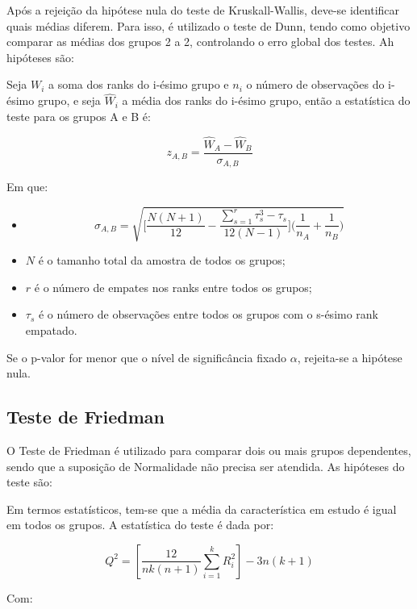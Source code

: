 \documentclass[
]{estat/estat}
\providecommand{\tightlist}{%
  \setlength{\itemsep}{0pt}\setlength{\parskip}{0pt}}\usepackage{longtable,booktabs,array}
\begin{document}
Após a rejeição da hipótese nula do teste de Kruskall-Wallis, deve-se
identificar quais médias diferem. Para isso, é utilizado o teste de
Dunn, tendo como objetivo comparar as médias dos grupos 2 a 2,
controlando o erro global dos testes. Ah hipóteses são:


Seja \(W_i\) a soma dos ranks do i-ésimo grupo e \(n_i\) o número de
observações do i-ésimo grupo, e seja \(\hat{W}_i\) a média dos ranks do
i-ésimo grupo, então a estatística do teste para os grupos A e B é:

\[z_{A,B} = \frac{\hat{W}_A - \hat{W}_B}{\sigma_{A,B}} \]

Em que:

\begin{itemize}
\tightlist
\item
  \[\sigma_{A,B} = \sqrt{\Bigg[\frac{N(N+1)}{12}-\frac{\sum^r_{s=1}\tau_s^3-\tau_s}{12(N-1)}\Bigg]\Bigg(\frac{1}{n_A}+\frac{1}{n_B}\Bigg)}\]
\item
  \(N\) é o tamanho total da amostra de todos os grupos;
\item
  \(r\) é o número de empates nos ranks entre todos os grupos;
\item
  \(\tau_s\) é o número de observações entre todos os grupos com o
  s-ésimo rank empatado.
\end{itemize}

Se o p-valor for menor que o nível de significância fixado \(\alpha\),
rejeita-se a hipótese nula.

\hypertarget{teste-de-friedman}{%
\subsection{Teste de Friedman}\label{teste-de-friedman}}

O Teste de Friedman é utilizado para comparar dois ou mais grupos
dependentes, sendo que a suposição de Normalidade não precisa ser
atendida. As hipóteses do teste são:


Em termos estatísticos, tem-se que a média da característica em estudo é
igual em todos os grupos. A estatística do teste é dada por:

\[Q^2=\left[\frac{12}{nk(n+1)} \sum_{i=1}^k R_i^2\right] - 3n(k+1)\]

Com:
\end{document}
